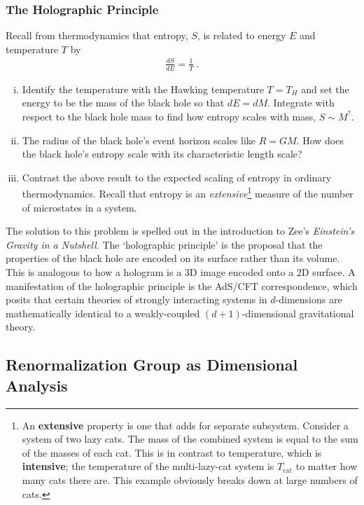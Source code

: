 \documentclass[12pt]{article}
\numberwithin{equation}{subsection}    %
\begin{document}
\subsubsection{The Holographic Principle}

Recall from thermodynamics that entropy, $S$, is related to energy $E$ and temperature $T$ by
\begin{align}
	\frac{dS}{dE} = \frac{1}{T} \ .
\end{align}
\begin{enumerate}[(i)]
	\item Identify the temperature with the Hawking temperature $T=T_H$ and set the energy to be the mass of the black hole so that $dE = dM$. Integrate with respect to the black hole mass to find how entropy scales with mass, $S \sim M^?$.
	\item The radius of the black hole's event horizon scales like $R = GM$. How does the black hole's entropy scale with its characteristic length scale? 
	\item Contrast the above result to the expected scaling of entropy in ordinary thermodynamics. Recall that entropy is an \emph{extensive}\footnote{An \textbf{extensive} property is one that adds for separate subsystem. Consider a system of two lazy cats. The mass of the combined system is equal to the sum of the masses of each cat. This is in contrast to temperature, which is \textbf{intensive}; the temperature of the multi-lazy-cat system is $T_\text{cat}$ to matter how many cats there are. This example obviously breaks down at large numbers of cats.} measure of the number of microstates in a system.
\end{enumerate}

The solution to this problem is spelled out in  the introduction to Zee's \emph{Einstein's Gravity in a Nutshell}. The `holographic principle' is the proposal that the properties of the black hole are encoded on its surface rather than its volume. This is analogous to how a hologram is a 3D image encoded onto a 2D surface. A manifestation of the holographic principle is the AdS/CFT correspondence, which posits that certain theories of strongly interacting systems in $d$-dimensions are mathematically identical to a weakly-coupled $(d+1)$-dimensional gravitational theory.




\subsection{Renormalization Group as Dimensional Analysis}
\end{document}
